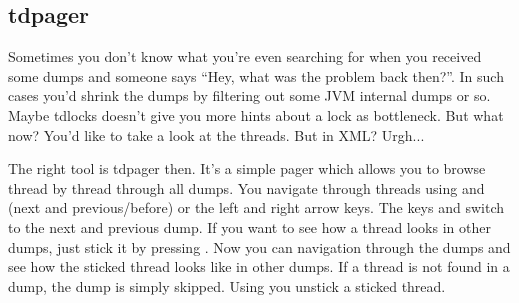 \subsection{tdpager}

Sometimes you don't know what you're even searching for when you received some dumps and someone says ``Hey, what was the problem back then?''.
In such cases you'd shrink the dumps by filtering out some JVM internal dumps or so.
Maybe tdlocks doesn't give you more hints about a lock as bottleneck.
But what now?
You'd like to take a look at the threads.
But in XML? Urgh...

The right tool is tdpager then.
It's a simple pager which allows you to browse thread by thread through all dumps.
You navigate through threads using  and  (next and previous/before) or the left and right arrow keys.
The keys  and  switch to the next and previous dump.
If you want to see how a thread looks in other dumps, just stick it by pressing .
Now you can navigation through the dumps and see how the sticked thread looks like in other dumps.
If a thread is not found in a dump, the dump is simply skipped.
Using  you unstick a sticked thread.
